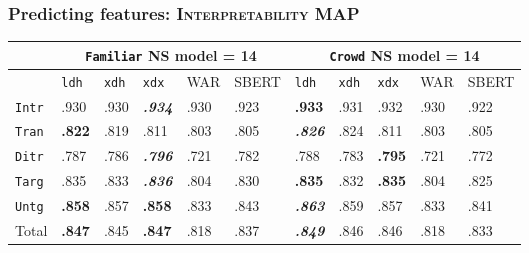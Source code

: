 \documentclass[handout,xcolor={dvipsnames}]{beamer}
\newcommand{\feat}[1]{\textsc{#1}}
\newcommand{\param}[1]{\texttt{#1}}
\begin{document}
\begin{frame}
\frametitle{Predicting features: \feat{Interpretability} MAP}

\small

\begin{table}[htb!]
\begin{center}
\setlength{\tabcolsep}{.35em}
\begin{tabular}{|l||l|l|l||l|l||l|l|l||l|l|}
\hline
 & \multicolumn{5}{c||}{\param{Fam\-il\-iar} NS model = 14} & \multicolumn{5}{c|}{\param{Crowd} NS model = 14} \\
\hline
    		& \param{ldh}	& \param{xdh} &	\param{xdx} & WAR	& {\scriptsize SBERT} & \param{ldh}	& \param{xdh} &	\param{xdx} & WAR	& {\scriptsize SBERT} \\ \hline
\hline
\param{Intr}  & .930          & .930 & \textit{\textbf{.934}} & .930 & .923 & \textbf{.933}          & .931 & .932          & .930 & .922 \\ \hline
\param{Tran}  & \textbf{.822} & .819 & .811                   & .803 & .805 & \textit{\textbf{.826}} & .824 & .811          & .803 & .805 \\ \hline
\param{Ditr}  & .787          & .786 & \textit{\textbf{.796}} & .721 & .782 & .788                   & .783 & \textbf{.795} & .721 & .772 \\ \hline
\hline
\param{Targ}  & .835          & .833 & \textit{\textbf{.836}} & .804 & .830 & \textbf{.835}          & .832 & \textbf{.835} & .804 & .825 \\ \hline
\param{Untg}  & \textbf{.858} & .857 & \textbf{.858}          & .833 & .843 & \textit{\textbf{.863}} & .859 & .857          & .833 & .841 \\ \hline
\hline
Total & \textbf{.847} & .845 & \textbf{.847}          & .818 & .837 & \textit{\textbf{.849}} & .846 & .846          & .818 & .833 \\ \hline
\end{tabular}
\end{center}
\end{table}



\end{frame}
\end{document}
